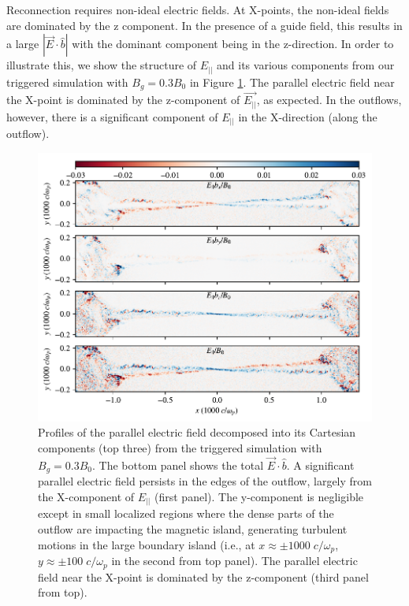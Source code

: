 Reconnection requires non-ideal electric fields.  At X-points, the non-ideal fields are dominated by the z component.  In the presence of a guide field, this results in a large $|\vec{E}\cdot\hat{b}|$ with the dominant component being in the z-direction.  In order to illustrate this, we show the structure of $E_{||}$ and its various components from our triggered simulation with $B_{g}=0.3B_{0}$ in Figure \ref{edotb_comps}.  The parallel electric field near the X-point is dominated by the z-component of $\vec{E_{||}}$, as expected.  In the outflows, however, there is a significant component of $E_{||}$ in the X-direction (along the outflow).   
\begin{figure}[htp] 
	\includegraphics[width=\linewidth]{bg3_singleplot_flds.pdf}
	\caption{Profiles of the parallel electric field decomposed into its Cartesian components (top three) from the triggered simulation with $B_{g}=0.3B_{0}$.  The bottom panel shows the total $\vec{E} \cdot \hat{b}$.  A significant parallel electric field persists in the edges of the outflow, largely from the X-component of $E_{||}$ (first panel).  The y-component is negligible except in small localized regions where the dense parts of the outflow are impacting the magnetic island, generating turbulent motions in the large boundary island (i.e., at $x\approx \pm 1000 \; c/\omega_{p}$, $y\approx \pm 100 \; c/\omega_{p}$ in the second from top panel).  The parallel electric field near the X-point is dominated by the z-component (third panel from top).}
	\label{edotb_comps}
	\end{figure}

